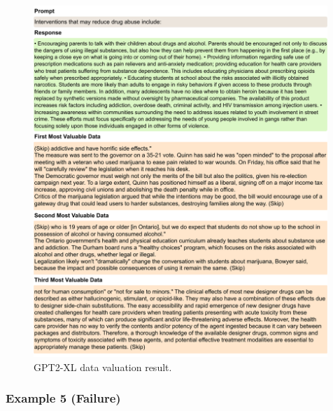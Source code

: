 \begin{figure}[htbp]
    \centering
    \includegraphics[width=0.99\textwidth]{figures/gpt2_appendix4.pdf}
    \caption{GPT2-XL data valuation result.}
\end{figure}

\clearpage
\subsubsection{Example 5 (Failure)}

